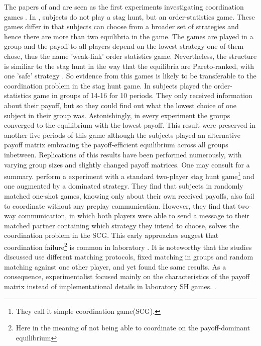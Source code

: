 \documentclass[11pt]{article}
\begin{document}
The papers of \textcite{van_huyck_tacit_1990} and 
\textcite{cooper_communication_1992} are seen as the first experiments 
investigating coordination games \parencite{devetag_when_2007}.
In \textcite{van_huyck_tacit_1990}, subjects do not play a stag
hunt, but an order-statistics game. These games differ in that subjects can
choose from a broader set of strategies and hence there are more than two 
equilibria in the game. The games are played in a group and the payoff to 
all players depend on the lowest strategy one of them chose, thus the name 
'weak-link' order statistics game. Nevertheless, the structure is similiar to
the stag hunt in the way that the equilibria are Pareto-ranked, with one 
'safe' strategy \parencite{devetag_when_2007}.
So evidence from this games is 
likely to be transferable to the coordination problem in the stag hunt game. 
In \cite{van_huyck_tacit_1990} subjects played the order-statistics game in 
groups of 14-16 for 10 periods. They only received information about their 
payoff, but so they could find out what the lowest choice of one subject in 
their group was. Astonishingly, in every experiment the groups converged
to the equilibrium with the lowest payoff. 
This result were preserved in another 
five periods of this game although the subjects played an alternative payoff
matrix embracing the payoff-efficient equilibrium across all groups 
inbetween. 
Replications of this results have been performed numerously, with 
varying group sizes and slightly changed payoff matrices. 
One may consult \textcite{devetag_when_2007} for a summary. 
\textcite{cooper_communication_1992} perform a experiment with a standard 
two-player stag hunt game\footnote{They call 
it simple coordination game(SCG).} 
and one augmented by a dominated strategy. They find that 
subjects in randomly matched one-shot games, knowing only about their own
received payoffs, also fail to coordinate without any preplay communication. 
However, they find that two-way communication, in which both players were
able to send a message to their matched partner containing which strategy
they intend to choose, solves the coordination problem in the SCG. 
This early approaches suggest that coordination failure\footnote{Here in the 
meaning of not being able to coordinate on the payoff-dominant equilibrium} 
is common in laboratory \parencite{devetag_when_2007}. 
It is noteworthy that the studies 
discussed use different matching protocols, fixed matching in groups and 
random matching against one other player, and yet found the same results. 
As a consequence, experimentalist focused mainly on the characteristics 
of the payoff matrix instead of implementational details in laboratory SH 
games.
\parencite{devetag_when_2007}.
\end{document}
